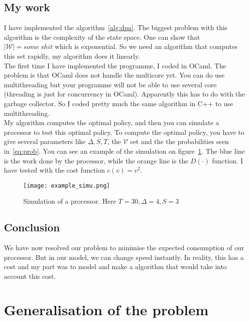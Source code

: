 \documentclass[
10pt, %
a4paper, %
oneside, %
headinclude,footinclude, %
BCOR5mm, %
]{scrartcl}
\newcommand{\V}{\mathcal{V}}
\newcommand{\W}{\mathcal{W}}
\begin{document}
\subsection{My work}
I have implemented the algorithm~\ref{alg:dpa}. The biggest problem
with this algorithm is the complexity of the state space. One can show
that $|\W|=some~shit$ which is exponential. So we need an algorithm
that computes this set rapidly, my algorithm does it linearly.\\
The first time I have implemented the programme, I coded in OCaml. The
problem is that OCaml does not handle the multicore yet. You can do
use multithreading but your programme will not be able to use several
core (threading is just for concurrency in OCaml). Apparently this has
to do with the garbage collector. So I coded pretty much the same
algorithm in C++ to use multithreading.\\
My algorithm computes the optimal policy, and then you can simulate a
processor to test this optimal policy. To compute the optimal policy,
you have to give several parameters like $\Delta, S,T$, the $\V$
set and the the probabilities seen in~\ref{eq:prob}.
You can see an example of the simulation on
figure~\ref{fig:simu}. The blue line is the work done by the
processor, while the orange line is the $D(\cdot)$ function. I have
tested with the cost function $c(v)=v^2$.

\begin{figure}
  \centering
  \texttt{[image: example\_simu.png]}
  \caption{Simulation of a processor. Here $T=30,\Delta=4,S=3$}
  \label{fig:simu}
\end{figure}

\subsection{Conclusion}

We have now resolved our problem to minimise the expected consumption
of our processor. But in our model, we can change speed instantly. In
reality, this has a cost and my part was to model and make a algorithm
that would take into account this cost.

\section{Generalisation of the problem}
\end{document}
